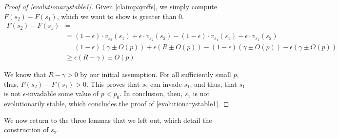 \documentclass[11pt]{amsart}
\theoremstyle{definition}
\theoremstyle{remark}
\begin{document}
\begin{proof}[Proof of \cref{evolutionarystable1}]
      Given \cref{claimpayoffs}, we simply compute $F(s_2) - F(s_1)$, which we want to show is greater than 0.
      \begin{align*}
        F(s_2) - F(s_1) &= \\
        &= (1 - \epsilon) \cdot v_{s_2}(s_1) + \epsilon \cdot v_{s_2}(s_2) - (1 - \epsilon) \cdot v_{s_1}(s_1) - \epsilon \cdot v_{s_1}(s_2) \\
        &= (1 - \epsilon) (\gamma \pm O(p)) + \epsilon (R \pm O(p)) - (1-\epsilon) (\gamma \pm O(p)) - \epsilon (\gamma \pm O(p)) \\
        &\geq \epsilon (R - \gamma) \pm O(p)
      \end{align*}

      We know that $R - \gamma > 0$ by our initial assumption. For all sufficiently small $p$, thus, $F(s_2) - F(s_1) > 0$. This proves that $s_2$ can invade $s_1$, and thus, that $s_1$ is not $\epsilon$-invadable some value of $p < p_0$. In conclusion, then, $s_1$ is not evolutionarily stable, which concludes the proof of \cref{evolutionarystable1}.

    \end{proof}

      We now return to the three lemmas that we left out, which detail the construction of $s_2$.
\end{document}
